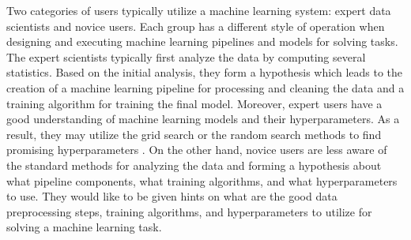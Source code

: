 Two categories of users typically utilize a machine learning system: expert data scientists and novice users.
Each group has a different style of operation when designing and executing machine learning pipelines and models for solving tasks.
The expert scientists typically first analyze the data by computing several statistics.
Based on the initial analysis, they form a hypothesis which leads to the creation of a machine learning pipeline for processing and cleaning the data and a training algorithm for training the final model.
Moreover, expert users have a good understanding of machine learning models and their hyperparameters.
As a result, they may utilize the grid search or the random search methods to find promising hyperparameters \cite{bergstra2012random}.
On the other hand, novice users are less aware of the standard methods for analyzing the data and forming a hypothesis about what pipeline components, what training algorithms, and what hyperparameters to use. 
They would like to be given hints on what are the good data preprocessing steps, training algorithms, and hyperparameters to utilize for solving a machine learning task.

